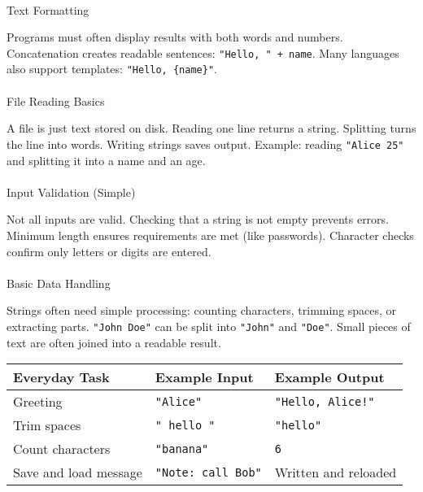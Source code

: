 \documentclass[
  letterpaper,
  DIV=11,
  numbers=noendperiod]{scrreprt}
\makeatletter
\let\oldparagraph\paragraph
\renewcommand{\paragraph}{
    \@ifstar
      \xxxParagraphStar
      \xxxParagraphNoStar
  }
\newcommand{\xxxParagraphStar}[1]{\oldparagraph*{#1}\mbox{}}
\newcommand{\xxxParagraphNoStar}[1]{\oldparagraph{#1}\mbox{}}
\makeatother
\begin{document}
\paragraph{Text Formatting}\label{text-formatting}

Programs must often display results with both words and numbers.
Concatenation creates readable sentences: \texttt{"Hello,\ "\ +\ name}.
Many languages also support templates: \texttt{"Hello,\ \{name\}"}.

\paragraph{File Reading Basics}\label{file-reading-basics}

A file is just text stored on disk. Reading one line returns a string.
Splitting turns the line into words. Writing strings saves output.
Example: reading \texttt{"Alice\ 25"} and splitting it into a name and
an age.

\paragraph{Input Validation (Simple)}\label{input-validation-simple}

Not all inputs are valid. Checking that a string is not empty prevents
errors. Minimum length ensures requirements are met (like passwords).
Character checks confirm only letters or digits are entered.

\paragraph{Basic Data Handling}\label{basic-data-handling}

Strings often need simple processing: counting characters, trimming
spaces, or extracting parts. \texttt{"John\ Doe"} can be split into
\texttt{"John"} and \texttt{"Doe"}. Small pieces of text are often
joined into a readable result.

\begin{longtable}[]{@{}lll@{}}
\toprule\noalign{}
Everyday Task & Example Input & Example Output \\
\midrule\noalign{}
\endhead
\bottomrule\noalign{}
\endlastfoot
Greeting & \texttt{"Alice"} & \texttt{"Hello,\ Alice!"} \\
Trim spaces & \texttt{"\ hello\ "} & \texttt{"hello"} \\
Count characters & \texttt{"banana"} & \texttt{6} \\
Save and load message & \texttt{"Note:\ call\ Bob"} & Written and
reloaded \\
\end{longtable}
\end{document}
